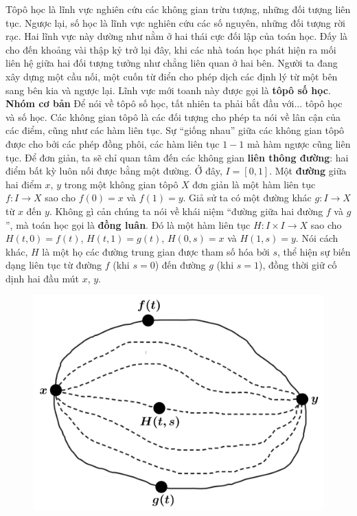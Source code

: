 \begin{multicols}{2}	
	Tôpô học là lĩnh vực nghiên cứu các không gian trừu tượng, những đối tượng liên tục. Ngược lại, số học là lĩnh vực nghiên cứu các số nguyên, những đối tượng rời rạc. Hai lĩnh vực này dường như nằm ở hai thái cực đối lập của toán học. Đấy là cho đến khoảng vài thập kỷ trở lại đây, khi các nhà toán học phát hiện ra mối liên hệ giữa hai đối tượng tưởng như chẳng liên quan ở hai bên. Người ta đang xây dựng một cầu nối, một cuốn từ điển cho phép dịch các định lý từ một bên sang bên kia và ngược lại. Lĩnh vực mới toanh này được gọi là {\bf\color{duongvaotoanhoc} tôpô số học}.
	\vskip 0.1cm
	\textbf{\color{duongvaotoanhoc}Nhóm cơ bản}
	\vskip 0.1cm
	Để nói về tôpô số học, tất nhiên ta phải bắt đầu với... tôpô học và số học. Các không gian tôpô là các đối tượng cho phép ta nói về lân cận của các điểm, cũng như các hàm liên tục. Sự ``giống nhau'' giữa các không gian tôpô được cho bởi các {phép đồng phôi}, các hàm liên tục $1-1$ mà hàm ngược cũng liên tục. Để đơn giản, ta sẽ chỉ quan tâm đến các không gian {\bf\color{duongvaotoanhoc} liên thông đường}: hai điểm bất kỳ luôn nối được bằng một đường. Ở đây, $I = [0,1]$. Một {\bf\color{duongvaotoanhoc} đường} giữa hai điểm $x$, $y$ trong một không gian tôpô $X$ đơn giản là một hàm liên tục $f: I \to X$ sao cho $f(0) = x$ và $f(1) = y$.
	\vskip 0.1cm
	Giả sử ta có một đường khác $g: I \to X$ từ $x$ đến $y$. Không gì cản chúng ta nói về khái niệm ``đường giữa hai đường $f$ và $g$'', mà toán học gọi là {\bf\color{duongvaotoanhoc} đồng luân}. Đó là một hàm liên tục $H: I \times I \to X$ sao cho $H(t,0) = f(t)$, $H(t,1) = g(t)$, $H(0,s) = x$ và $H(1,s) = y$. Nói cách khác, $H$ là một họ các đường trung gian được tham số hóa bởi $s$, thể hiện sự biến dạng liên tục từ đường $f$ (khi $s=0$) đến đường $g$ (khi $s = 1$), đồng thời giữ cố dịnh hai đầu mút $x$, $y$. 
	\begin{figure}[H]
		\vspace*{-5pt}
		\centering
		\captionsetup{labelformat= empty, justification=centering}
		\includegraphics[width= 0.9\linewidth]{h1.png}

\end{figure}
\end{multicols}
